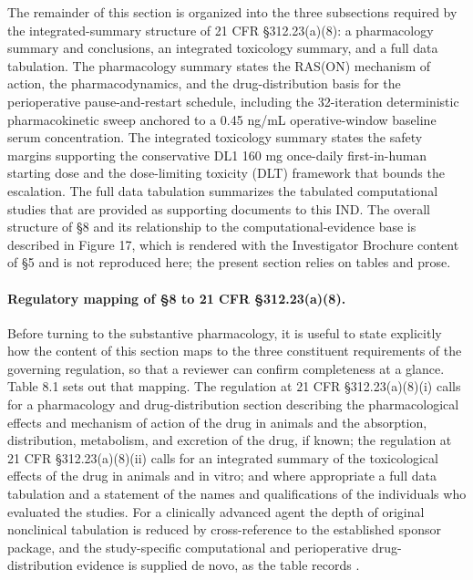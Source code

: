 The remainder of this section is organized into the three subsections required
by the integrated-summary structure of 21 CFR \S 312.23(a)(8): a pharmacology
summary and conclusions, an integrated toxicology summary, and a full data
tabulation. The pharmacology summary states the RAS(ON) mechanism of action, the
pharmacodynamics, and the drug-distribution basis for the perioperative
pause-and-restart schedule, including the 32-iteration deterministic
pharmacokinetic sweep anchored to a 0.45 ng/mL operative-window baseline serum
concentration. The integrated toxicology summary states the safety margins
supporting the conservative DL1 160 mg once-daily first-in-human starting dose
and the dose-limiting toxicity (DLT) framework that bounds the escalation. The
full data tabulation summarizes the tabulated computational studies that are
provided as supporting documents to this IND. The overall structure of \S 8 and
its relationship to the computational-evidence base is described in Figure 17,
which is rendered with the Investigator Brochure content of \S 5 and is not
reproduced here; the present section relies on tables and prose.

\paragraph{Regulatory mapping of \S 8 to 21 CFR \S 312.23(a)(8).}
Before turning to the substantive pharmacology, it is useful to state explicitly
how the content of this section maps to the three constituent requirements of the
governing regulation, so that a reviewer can confirm completeness at a glance.
Table 8.1 sets out that mapping. The regulation at 21 CFR \S 312.23(a)(8)(i)
calls for a pharmacology and drug-distribution section describing the
pharmacological effects and mechanism of action of the drug in animals and the
absorption, distribution, metabolism, and excretion of the drug, if known; the
regulation at 21 CFR \S 312.23(a)(8)(ii) calls for an integrated summary of the
toxicological effects of the drug in animals and in vitro; and where appropriate
a full data tabulation and a statement of the names and qualifications of the
individuals who evaluated the studies. For a clinically advanced agent the depth
of original nonclinical tabulation is reduced by cross-reference to the
established sponsor package, and the study-specific computational and
perioperative drug-distribution evidence is supplied de novo, as the table
records \cite{phase1guidance,daraxwhipple}.



